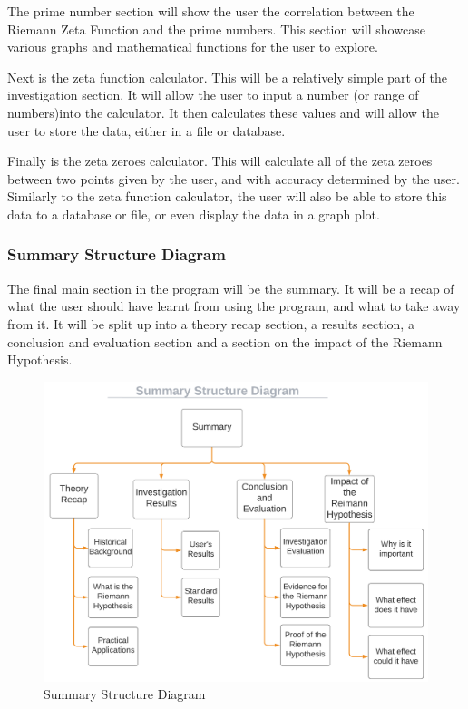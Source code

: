 \documentclass{article}
\begin{document}
The prime number section will show the user the correlation between the Riemann Zeta Function and the prime numbers. This section will showcase various graphs and mathematical functions for the user to explore.

Next is the zeta function calculator. This will be a relatively simple part of the investigation section. It will allow the user to input a number (or range of numbers)into the calculator. It then calculates these values and will allow the user to store the data, either in a file or database.

Finally is the zeta zeroes calculator. This will calculate all of the zeta zeroes between two points given by the user, and with accuracy determined by the user. Similarly to the zeta function calculator, the user will also be able to store this data to a database or file, or even display the data in a graph plot.


\subsubsection{Summary Structure Diagram}

The final main section in the program will be the summary. It will be a recap of what the user should have learnt from using the program, and what to take away from it. It will be split up into a theory recap section, a results section, a conclusion and evaluation section and a section on the impact of the Riemann Hypothesis.


\begin{figure}[h]
    \centering
    \captionsetup{justification=centering}
    \includegraphics[scale=0.5]{summary-structure-diagram}
    \caption{Summary Structure Diagram}
\end{figure}
\end{document}
